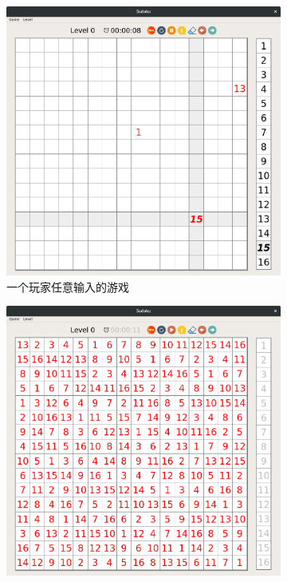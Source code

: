 \documentclass[11pt,a4paper]{article}
\begin{document}
\begin{figure}[H]
	\vspace{0.5cm}
	\begin{subfigure}{.45\textwidth}
		\centering
		\includegraphics[width=\linewidth]{sudoku-4c.png}
		\caption{一个玩家任意输入的游戏} \label{fig:sudoku-4c}
	\end{subfigure}
	\hfill
	\begin{subfigure}{.45\textwidth}
		\centering
		\includegraphics[width=\linewidth]{sudoku-4d.png}

\end{subfigure}
\end{figure}
\end{document}
